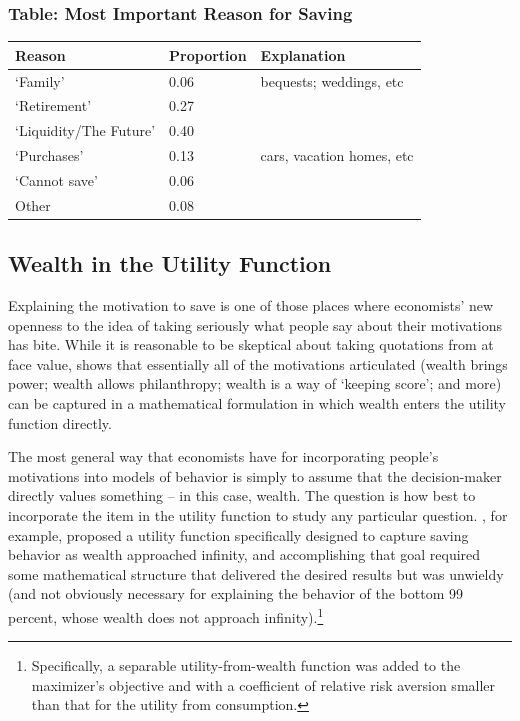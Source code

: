 \documentclass{article}
\begin{document}
\subsubsection{Table: Most Important Reason for Saving}\label{most-important-reason}

\bigskip\noindent
\begin{tabular}{p{}p{}p{}}
\toprule
Reason & Proportion & Explanation \\
\hline
`Family' & 0.06 & bequests; weddings, etc \\
`Retirement' & 0.27 &  \\
`Liquidity/The Future' & 0.40 &  \\
`Purchases' & 0.13 & cars, vacation homes, etc \\
`Cannot save' & 0.06 &  \\
Other & 0.08 &  \\
\bottomrule
\end{tabular}

\bigskip\subsection{Wealth in the Utility Function}

Explaining the motivation to save is one of those places where economists' new openness to the idea of taking seriously what people say about their motivations has bite.
While it is reasonable to be skeptical about taking quotations from \cite{jaherGilded} at face value, \cite{WhyDoTheRich} shows that essentially all of the motivations articulated (wealth brings power; wealth allows philanthropy; wealth is a way of `keeping score'; and more) can be captured in a mathematical formulation in which wealth enters the utility function directly.

The most general way that economists have for incorporating people's motivations into models of behavior is simply to assume that the decision-maker directly values something -- in this case, wealth.
The question is how best to incorporate the item in the utility function to study any particular question.
\cite{WhyDoTheRich}, for example, proposed a utility function specifically designed to capture saving behavior as wealth approached infinity, and accomplishing that goal required some mathematical structure that delivered the desired results but was unwieldy (and not obviously necessary for explaining the behavior of the bottom 99 percent, whose wealth does not approach infinity).\footnote{Specifically, a separable utility-from-wealth function was added to the maximizer's objective and with a coefficient of relative risk aversion smaller than that for the utility from consumption.}
\end{document}
